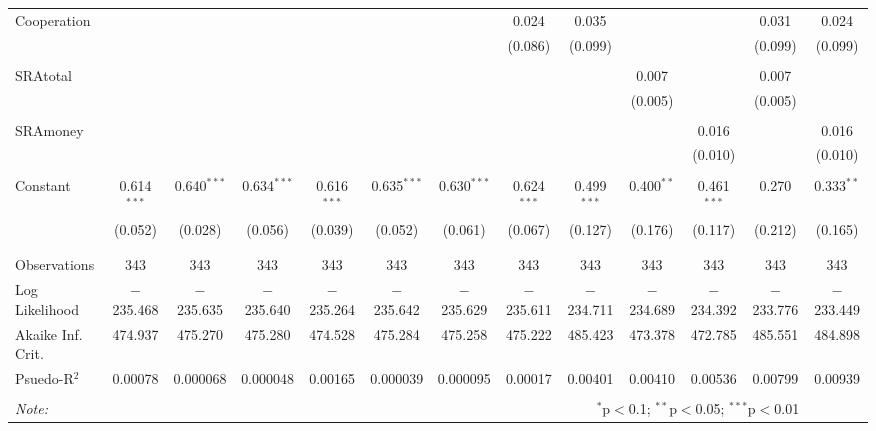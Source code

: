 \begin{table}[H]
\begin{adjustbox}{width=\textwidth}
\begin{tabular}{@{\extracolsep{5pt}}lcccccccccccc}
 Cooperation &  &  &  &  &  &  & 0.024 & 0.035 &  &  & 0.031 & 0.024 \\ 
  &  &  &  &  &  &  & (0.086) & (0.099) &  &  & (0.099) & (0.099) \\ 
  & & & & & & & & & & & & \\ 
 SRAtotal &  &  &  &  &  &  &  &  & 0.007 &  & 0.007 &  \\ 
  &  &  &  &  &  &  &  &  & (0.005) &  & (0.005) &  \\ 
  & & & & & & & & & & & & \\ 
 SRAmoney &  &  &  &  &  &  &  &  &  & 0.016 &  & 0.016 \\ 
  &  &  &  &  &  &  &  &  &  & (0.010) &  & (0.010) \\ 
  & & & & & & & & & & & & \\ 
 Constant & 0.614$^{***}$ & 0.640$^{***}$ & 0.634$^{***}$ & 0.616$^{***}$ & 0.635$^{***}$ & 0.630$^{***}$ & 0.624$^{***}$ & 0.499$^{***}$ & 0.400$^{**}$ & 0.461$^{***}$ & 0.270 & 0.333$^{**}$ \\ 
  & (0.052) & (0.028) & (0.056) & (0.039) & (0.052) & (0.061) & (0.067) & (0.127) & (0.176) & (0.117) & (0.212) & (0.165) \\ 
  & & & & & & & & & & & & \\ 
\hline \\[-1.8ex] 
Observations & 343 & 343 & 343 & 343 & 343 & 343 & 343 & 343 & 343 & 343 & 343 & 343 \\ 
Log Likelihood & $-$235.468 & $-$235.635 & $-$235.640 & $-$235.264 & $-$235.642 & $-$235.629 & $-$235.611 & $-$234.711 & $-$234.689 & $-$234.392 & $-$233.776 & $-$233.449 \\ 
Akaike Inf. Crit. & 474.937 & 475.270 & 475.280 & 474.528 & 475.284 & 475.258 & 475.222 & 485.423 & 473.378 & 472.785 & 485.551 & 484.898 \\ 
Psuedo-R$^{2}$ & 0.00078 & 0.000068 & 0.000048 & 0.00165 & 0.000039 & 0.000095 & 0.00017 & 0.00401 & 0.00410 & 0.00536 & 0.00799 & 0.00939 \\
\hline 
\hline \\[-1.8ex] 
\textit{Note:}  & \multicolumn{11}{r}{$^{*}$p$<$0.1; $^{**}$p$<$0.05; $^{***}$p$<$0.01} \\ 
\end{tabular} 
\end{adjustbox}
\end{table}
\newpage


